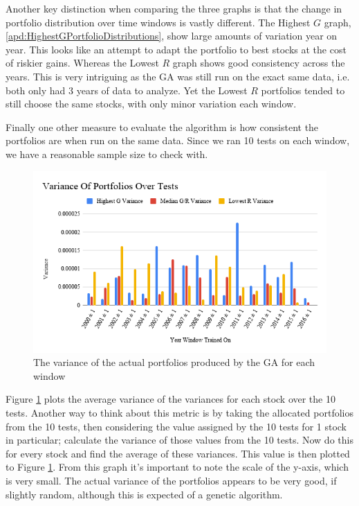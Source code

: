 \documentclass[11pt]{article}
\begin{document}
    Another key distinction when comparing the three graphs is that the change in
    portfolio distribution over time windows is vastly different. The Highest
    \(G\) graph, \ref{apd:HighestGPortfolioDistributions}, show large amounts
    of variation year on year. This looks like an attempt to adapt the portfolio
    to best stocks at the cost of riskier gains. Whereas the Lowest \(R\) graph
    shows good consistency across the years. This is very intriguing as the
    GA was still run on the exact same data, i.e. both only had 3 years of data to
    analyze. Yet the Lowest \(R\) portfolios tended to still choose the same stocks,
    with only minor variation each window.

    Finally one other measure to evaluate the algorithm is how consistent the portfolios
    are when run on the same data. Since we ran 10 tests on each window, we have a reasonable
    sample size to check with.

    \begin{figure}[H] %
        \includegraphics[width=\textwidth]{VarianceOfPortfoliosOverTests}
        \caption{The variance of the actual portfolios produced by the GA for each window}
            \label{fig:VarianceOfPortfoliosOverTests}
    \end{figure}

    Figure \ref{fig:VarianceOfPortfoliosOverTests} plots the average variance of the variances for
    each stock over the 10 tests. Another way to think about this metric is by taking the allocated
    portfolios from the 10 tests, then considering the value assigned by the 10 tests for 1 stock in
    particular; calculate the variance of those values from the 10 tests. Now do this for every stock and find the
    average of these variances. This value is then plotted to Figure
    \ref{fig:VarianceOfPortfoliosOverTests}. From this graph it's important to note the scale of
    the y-axis, which is very small. The actual variance of the portfolios appears to be very
    good, if slightly random, although this is expected of a genetic algorithm.
\end{document}
